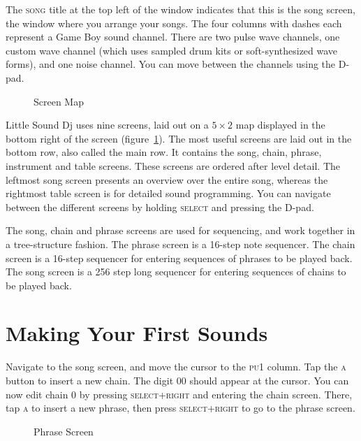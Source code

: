 The \textsc{song} title at the top left of the window indicates that this is the song screen, the
window where you arrange your songs. The four columns with dashes each represent a
Game Boy sound channel. There are two pulse wave channels, one custom wave channel
(which uses sampled drum kits or soft-synthesized wave forms), and one noise channel. You
can move between the channels using the D-pad.

\begin{figure}[hbtp]
\centering
{}
\caption{Screen Map}
\label{fig:map}
\end{figure}

Little Sound Dj uses nine screens, laid out on a \begin{math} 5 \times 2 \end{math} map displayed in the
bottom right of the screen (figure~\ref{fig:map}). The most useful screens are laid out in the bottom row, also called
the main row. It contains the song, chain, phrase, instrument and table screens. These screens
are ordered after level detail. The leftmost song screen presents an overview over the entire
song, whereas the rightmost table screen is for detailed sound programming. You can
navigate between the different screens by holding \textsc{select} and pressing the D-pad.

The song, chain and phrase screens are used for sequencing, and work together in a tree-structure
fashion. The phrase screen is a 16-step note sequencer.
The chain screen is a 16-step sequencer for entering sequences of phrases to
be played back. The song screen is a 256 step long sequencer for entering sequences of
chains to be played back.

\section{Making Your First Sounds}
Navigate to the song screen, and move the cursor to the \textsc{pu1} column. Tap the \textsc{a} button
to insert a new chain. The digit 00 should appear at the cursor. You can now edit chain 0 by pressing \textsc{select+right} and entering the chain screen. There, tap \textsc{a} to insert a new phrase, then press \textsc{select+right} to go to the
phrase screen.

\begin{figure}[hbtp]
\centering
{}
\caption{Phrase Screen}
\label{fig:phrase1}
\end{figure}

